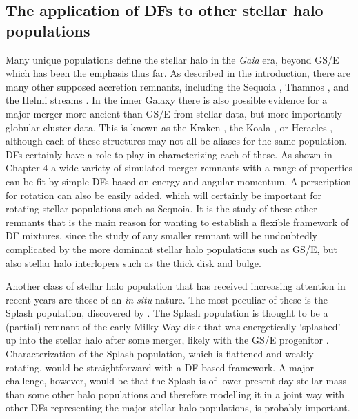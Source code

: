 \subsection{The application of DFs to other stellar halo populations}

Many unique populations define the stellar halo in the \textit{Gaia} era, beyond GS/E which has been the emphasis thus far. As described in the introduction, there are many other supposed accretion remnants, including the Sequoia \parencite{myeong19}, Thamnos \parencite{koppelman19b}, and the Helmi streams \parencite{helmi99,koppelman19a}. In the inner Galaxy there is also possible evidence for a major merger more ancient than GS/E from stellar data, but more importantly globular cluster data. This is known as the Kraken \parencite{kruijssen20}, the Koala \parencite{forbes20}, or Heracles \parencite{horta21a}, although each of these structures may not all be aliases for the same population. DFs certainly have a role to play in characterizing each of these. As shown in Chapter 4 a wide variety of simulated merger remnants with a range of properties can be fit by simple DFs based on energy and angular momentum. A perscription for rotation can also be easily added, which will certainly be important for rotating stellar populations such as Sequoia. It is the study of these other remnants that is the main reason for wanting to establish a flexible framework of DF mixtures, since the study of any smaller remnant will be undoubtedly complicated by the more dominant stellar halo populations such as GS/E, but also stellar halo interlopers such as the thick disk and bulge.

Another class of stellar halo population that has received increasing attention in recent years are those of an \textit{in-situ} nature. The most peculiar of these is the Splash population, discovered by \textcite{belokurov20}. The Splash population is thought to be a (partial) remnant of the early Milky Way disk that was energetically `splashed' up into the stellar halo after some merger, likely with the GS/E progenitor \parencite[although see][for a different hypothesis]{amarante20b}. Characterization of the Splash population, which is flattened and weakly rotating, would be straightforward with a DF-based framework. A major challenge, however, would be that the Splash is of lower present-day stellar mass than some other halo populations and therefore modelling it in a joint way with other DFs representing the major stellar halo populations, is probably important.

